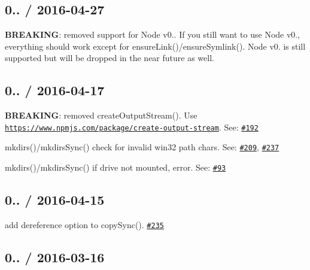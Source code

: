 \subsection*{0.. / 2016-\/04-\/27 }


\begin{DoxyItemize}
\item {\bfseries B\+R\+E\+A\+K\+I\+NG}\+: removed support for Node v0.. If you still want to use Node v0., everything should work except for {\ttfamily ensure\+Link()/ensure\+Symlink()}. Node v0. is still supported but will be dropped in the near future as well.
\end{DoxyItemize}

\subsection*{0.. / 2016-\/04-\/17 }


\begin{DoxyItemize}
\item {\bfseries B\+R\+E\+A\+K\+I\+NG}\+: removed {\ttfamily create\+Output\+Stream()}. Use \href{https://www.npmjs.com/package/create-output-stream}{\tt https\+://www.\+npmjs.\+com/package/create-\/output-\/stream}. See\+: \href{https://github.com/jprichardson/node-fs-extra/issues/192}{\tt \#192}
\item {\ttfamily mkdirs()/mkdirs\+Sync()} check for invalid win32 path chars. See\+: \href{https://github.com/jprichardson/node-fs-extra/issues/209}{\tt \#209}, \href{https://github.com/jprichardson/node-fs-extra/issues/237}{\tt \#237}
\item {\ttfamily mkdirs()/mkdirs\+Sync()} if drive not mounted, error. See\+: \href{https://github.com/jprichardson/node-fs-extra/issues/93}{\tt \#93}
\end{DoxyItemize}

\subsection*{0.. / 2016-\/04-\/15 }


\begin{DoxyItemize}
\item add {\ttfamily dereference} option to {\ttfamily copy\+Sync()}. \href{https://github.com/jprichardson/node-fs-extra/pull/235}{\tt \#235}
\end{DoxyItemize}

\subsection*{0.. / 2016-\/03-\/16 }


